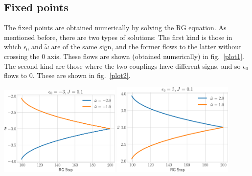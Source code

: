 \subsection{Fixed points}
The fixed points are obtained numerically by solving the RG equation. As mentioned before, there are two types of solutions: The first kind is those in which \(\epsilon_0\) and \(\tilde \omega\) are of the same sign, and the former flows to the latter without crossing the 0 axis. These flows are shown (obtained numerically) in fig.~\ref{plot1}. The second kind are those where the two couplings have different signs, and so \(\epsilon_0\) flows to 0. These are shown in fig.~\ref{plot2}.
\begin{center}
	\includegraphics[width=0.45\textwidth]{../figures/notzero1.pdf}
	\hspace*{\fill}
	\includegraphics[width=0.45\textwidth]{../figures/notzero2.pdf}
	\label{plot1}
\end{center}
